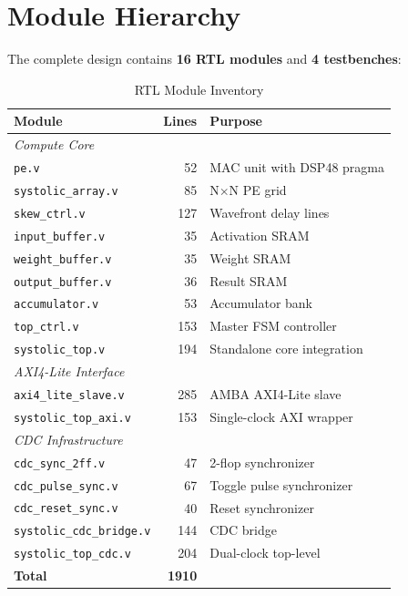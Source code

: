 \documentclass[12pt, a4paper]{article}
\begin{document}
\section{Module Hierarchy}

The complete design contains \textbf{16 RTL modules} and \textbf{4 testbenches}:

\begin{table}[H]
\centering
\caption{RTL Module Inventory}
\begin{tabular}{@{}lrl@{}}
\toprule
\textbf{Module} & \textbf{Lines} & \textbf{Purpose} \\
\midrule
\multicolumn{3}{l}{\textit{Compute Core}} \\
\texttt{pe.v}               & 52   & MAC unit with DSP48 pragma \\
\texttt{systolic\_array.v}  & 85   & N$\times$N PE grid \\
\texttt{skew\_ctrl.v}       & 127  & Wavefront delay lines \\
\texttt{input\_buffer.v}    & 35   & Activation SRAM \\
\texttt{weight\_buffer.v}   & 35   & Weight SRAM \\
\texttt{output\_buffer.v}   & 36   & Result SRAM \\
\texttt{accumulator.v}      & 53   & Accumulator bank \\
\texttt{top\_ctrl.v}        & 153  & Master FSM controller \\
\texttt{systolic\_top.v}    & 194  & Standalone core integration \\
\midrule
\multicolumn{3}{l}{\textit{AXI4-Lite Interface}} \\
\texttt{axi4\_lite\_slave.v}    & 285 & AMBA AXI4-Lite slave \\
\texttt{systolic\_top\_axi.v}   & 153 & Single-clock AXI wrapper \\
\midrule
\multicolumn{3}{l}{\textit{CDC Infrastructure}} \\
\texttt{cdc\_sync\_2ff.v}       & 47  & 2-flop synchronizer \\
\texttt{cdc\_pulse\_sync.v}     & 67  & Toggle pulse synchronizer \\
\texttt{cdc\_reset\_sync.v}     & 40  & Reset synchronizer \\
\texttt{systolic\_cdc\_bridge.v}& 144 & CDC bridge \\
\texttt{systolic\_top\_cdc.v}   & 204 & Dual-clock top-level \\
\midrule
\textbf{Total} & \textbf{1910} & \\
\bottomrule
\end{tabular}
\end{table}
\end{document}
